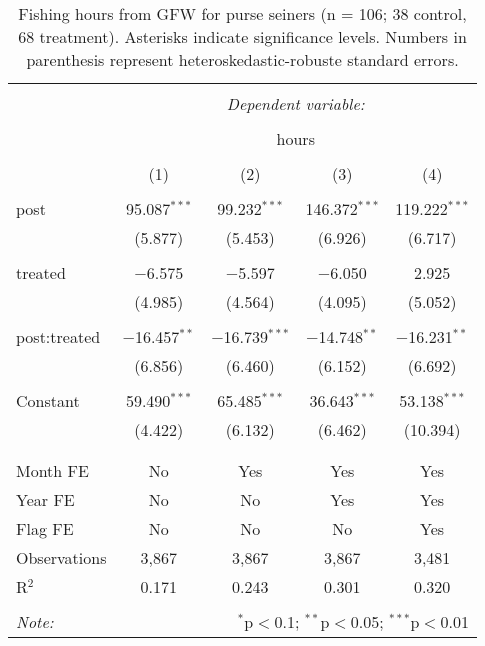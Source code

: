 \documentclass[12pt,]{article}
\begin{document}
\begin{table}[!htbp] \centering 
  \caption{\label{tab:purse_old}Fishing hours from GFW for purse seiners (n = 106; 38 control, 68 treatment). Asterisks indicate significance levels. Numbers in parenthesis represent heteroskedastic-robuste standard errors.} 
  \label{} 
\begin{tabular}{@{\extracolsep{5pt}}lcccc} 
\\[-1.8ex]\hline 
\hline \\[-1.8ex] 
 & \multicolumn{4}{c}{\textit{Dependent variable:}} \\ 
\cline{2-5} 
\\[-1.8ex] & \multicolumn{4}{c}{hours} \\ 
\\[-1.8ex] & (1) & (2) & (3) & (4)\\ 
\hline \\[-1.8ex] 
 post & 95.087$^{***}$ & 99.232$^{***}$ & 146.372$^{***}$ & 119.222$^{***}$ \\ 
  & (5.877) & (5.453) & (6.926) & (6.717) \\ 
  & & & & \\ 
 treated & $-$6.575 & $-$5.597 & $-$6.050 & 2.925 \\ 
  & (4.985) & (4.564) & (4.095) & (5.052) \\ 
  & & & & \\ 
 post:treated & $-$16.457$^{**}$ & $-$16.739$^{***}$ & $-$14.748$^{**}$ & $-$16.231$^{**}$ \\ 
  & (6.856) & (6.460) & (6.152) & (6.692) \\ 
  & & & & \\ 
 Constant & 59.490$^{***}$ & 65.485$^{***}$ & 36.643$^{***}$ & 53.138$^{***}$ \\ 
  & (4.422) & (6.132) & (6.462) & (10.394) \\ 
  & & & & \\ 
\hline \\[-1.8ex] 
Month FE & No & Yes & Yes & Yes \\ 
Year FE & No & No & Yes & Yes \\ 
Flag FE & No & No & No & Yes \\ 
Observations & 3,867 & 3,867 & 3,867 & 3,481 \\ 
R$^{2}$ & 0.171 & 0.243 & 0.301 & 0.320 \\ 
\hline 
\hline \\[-1.8ex] 
\textit{Note:}  & \multicolumn{4}{r}{$^{*}$p$<$0.1; $^{**}$p$<$0.05; $^{***}$p$<$0.01} \\ 
\end{tabular} 
\end{table}
\end{document}
